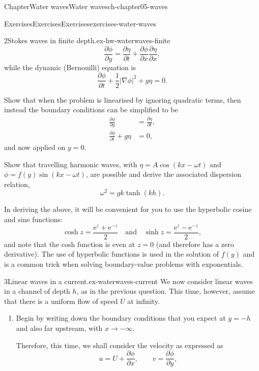 \documentclass[oneside,10pt,]{book}
\numberwithin{equation}{section}
\newcommand{\e}{\mathrm{e}}
\newcommand{\pd}[2]{\frac{\partial#1}{\partial#2}}
\newcommand{\amp}{&}
\begin{document}
\begin{chapterptx}{Chapter}{Water waves}{}{Water waves}{}{}{ch-chapter05-waves}
\begin{exercises-section}{Exercises}{Exercises}{}{Exercises}{}{}{exercises-water-waves}
\begin{divisionexercise}{2}{Stokes waves in finite depth.}{}{ex-hw-waterwaves-finite}
\begin{equation*}
\pd{\phi}{y}= \pd{\eta}{t} + \pd{\phi}{x}\pd{\eta}{x},
\end{equation*}
while the dynamic (Bernouilli) equation is%
\begin{equation*}
\pd{\phi}{t} + \frac{1}{2}|\nabla \phi|^2 + g\eta = 0.
\end{equation*}
%
\par
Show that when the problem is linearised by ignoring quadratic terms, then instead the boundary conditions can be simplified to be%
\begin{align*}
\pd{\phi}{y} \amp= \pd{\eta}{t}, \\
\pd{\phi}{t} + g\eta \amp= 0, 
\end{align*}
and now applied on \(y = 0\).%
\par
Show that travelling harmonic waves, with \(\eta = A\cos(kx - \omega t)\) and \(\phi = f(y)\sin(kx - \omega t)\), are possible and derive the associated dispersion relation,%
\begin{equation*}
\omega^2 = gk \tanh(kh). 
\end{equation*}
%
\par
In deriving the above, it will be convenient for you to use the hyperbolic cosine and sine functions:%
\begin{equation*}
\cosh z = \frac{\e^{z} + \e^{-z}}{2} \quad \text{and} \quad \sinh z = \frac{\e^{z} - \e^{-z}}{2},
\end{equation*}
and note that the cosh function is even at \(z = 0\) (and therefore has a zero derivative). The use of hyperbolic functions is used in the solution of \(f(y)\) and is a common trick when solving boundary-value problems with exponentials.%
\end{divisionexercise}%
\begin{divisionexercise}{3}{Linear waves in a current.}{}{ex-waterwaves-current}%
We now consider linear waves in a channel of depth \(h\), as in the previous question. This time, however, assume that there is a uniform flow of speed \(U\) at infinity.%
\begin{enumerate}[font=\bfseries,label=(\alph*),ref=\alph*]%
\item{}Begin by writing down the boundary conditions that you expect at \(y = -h\) and also far upstream, with \(x \to -\infty.\)%
\par
Therefore, this time, we shall consider the velocity as expressed as%
\begin{equation*}
u = U + \pd{\phi}{x}, \qquad v = \pd{\phi}{y},

\end{equation*}
\end{enumerate}
\end{divisionexercise}
\end{exercises-section}
\end{chapterptx}
\end{document}
